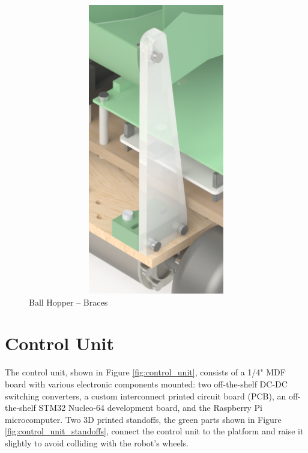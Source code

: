 \begin{figure}[H]   %
	\centering \includegraphics[width=6in, height=5in, keepaspectratio]{figures/hopper_brace.png}
	\caption{Ball Hopper -- Braces}	\label{fig:hopper_brace}
\end{figure}

\section{Control Unit}
The control unit, shown in Figure \ref{fig:control_unit}, consists of a 1/4" MDF board with various electronic components mounted: two off-the-shelf DC-DC switching converters, a custom interconnect printed circuit board (PCB), an off-the-shelf STM32 Nucleo-64 development board, and the Raspberry Pi microcomputer. Two 3D printed standoffs, the green parts shown in Figure \ref{fig:control_unit_standoffs}, connect the control unit to the platform and raise it slightly to avoid colliding with the robot's wheels. 

